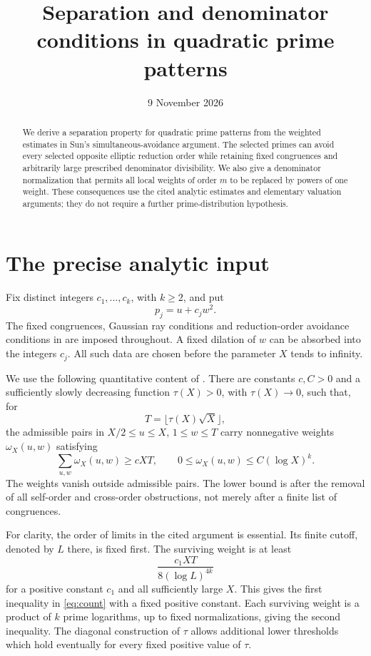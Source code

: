 \documentclass[11pt,a4paper]{article}
\title{Separation and denominator conditions in quadratic prime patterns}
\author{}\date{9 November 2026}
\theoremstyle{remark}\newtheorem{remark}[theorem]{Remark}
\begin{document}
\maketitle
\begin{abstract}
We derive a separation property for quadratic prime patterns from the
weighted estimates in Sun's simultaneous-avoidance argument. The selected
primes can avoid every selected opposite elliptic reduction order while
retaining fixed congruences and arbitrarily large prescribed denominator
divisibility. We also give a denominator normalization that permits all
local weights of order $m$ to be replaced by powers of one weight. These
consequences use the cited analytic estimates and elementary valuation
arguments; they do not require a further prime-distribution hypothesis.
\end{abstract}

\section{The precise analytic input}
Fix distinct integers $c_1,\ldots,c_k$, with $k\ge2$, and put
\[
 p_j=u+c_jw^2.
\]
The fixed congruences, Gaussian ray conditions and reduction-order
avoidance conditions in \cite[Theorem 4.1]{Sun} are imposed throughout.
A fixed dilation of $w$ can be absorbed into the integers $c_j$.
All such data are chosen before the parameter $X$ tends to infinity.

We use the following quantitative content of
\cite[Propositions 5.1 and 6.2, Section 6.1]{Sun}. There are constants
$c,C>0$ and a sufficiently slowly decreasing function $\tau(X)>0$,
with $\tau(X)\to0$, such that, for
\[
 T=\lfloor\tau(X)\sqrt X\rfloor,
\]
the admissible pairs in $X/2\le u\le X$, $1\le w\le T$ carry
nonnegative weights $\omega_X(u,w)$ satisfying
\begin{equation}\label{eq:count}
 \sum_{u,w}\omega_X(u,w)\ge cXT,
 \qquad 0\le\omega_X(u,w)\le C(\log X)^k.
\end{equation}
The weights vanish outside admissible pairs. The lower bound is after
the removal of all self-order and cross-order obstructions, not merely
after a finite list of congruences.

For clarity, the order of limits in the cited argument is essential.
Its finite cutoff, denoted by $L$ there, is fixed first. The surviving
weight is at least
\[
 \frac{c_1XT}{8(\log L)^{4k}}
\]
for a positive constant $c_1$ and all sufficiently large $X$.
This gives the first inequality in \eqref{eq:count} with a fixed
positive constant. Each surviving weight is a product of $k$ prime
logarithms, up to fixed normalizations, giving the second inequality.
The diagonal construction of $\tau$ allows additional lower thresholds
which hold eventually for every fixed positive value of $\tau$.
\end{document}
